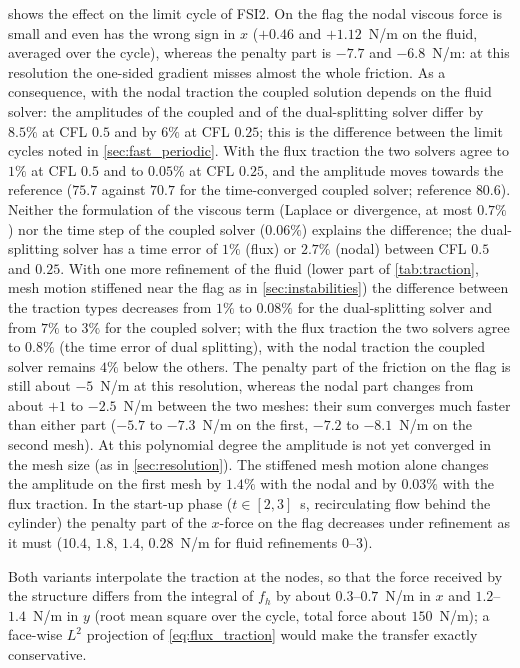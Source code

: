\documentclass[11pt,a4paper]{article}
\theoremstyle{definition}
\theoremstyle{remark}
\begin{document}
 shows the effect on the limit cycle of FSI2. On the flag the nodal viscous force
is small and even has the wrong sign in $x$ ($+0.46$ and $+1.12$~N/m on the fluid, averaged over
the cycle), whereas the penalty part is $-7.7$ and $-6.8$~N/m: at this resolution the one-sided
gradient misses almost the whole friction. As a consequence, with the nodal traction the coupled
solution depends on the fluid solver: the amplitudes of the coupled and of the dual-splitting
solver differ by $8.5\%$ at CFL $0.5$ and by $6\%$ at CFL $0.25$; this is the difference between
the limit cycles noted in \cref{sec:fast_periodic}. With the flux traction the two solvers agree to
$1\%$ at CFL $0.5$ and to $0.05\%$ at CFL $0.25$, and the amplitude moves towards the reference
($75.7$ against $70.7$ for the time-converged coupled solver; reference $80.6$). Neither the
formulation of the viscous term (Laplace or divergence, at most $0.7\%$) nor the time step of the
coupled solver ($0.06\%$) explains the difference; the dual-splitting solver has a time error of
$1\%$ (flux) or $2.7\%$ (nodal) between CFL $0.5$ and $0.25$. With one more refinement of the fluid (lower part of
\cref{tab:traction}, mesh motion stiffened near the flag as in \cref{sec:instabilities}) the
difference between the traction types decreases from $1\%$ to $0.08\%$ for the dual-splitting
solver and from $7\%$ to $3\%$ for the coupled solver; with the flux traction the two solvers agree
to $0.8\%$ (the time error of dual splitting), with the nodal traction the coupled solver remains
$4\%$ below the others. The penalty part of the friction on the flag is still about $-5$~N/m at
this resolution, whereas the nodal part changes from about $+1$ to $-2.5$~N/m between the two
meshes: their sum converges much faster than either part ($-5.7$ to $-7.3$~N/m on the first,
$-7.2$ to $-8.1$~N/m on the second mesh). At this polynomial degree the amplitude is not yet
converged in the mesh size (as in \cref{sec:resolution}). The stiffened mesh motion alone changes
the amplitude on the first mesh by $1.4\%$ with the nodal and by $0.03\%$ with the flux traction.
In the start-up phase ($t\in[2,3]$~s, recirculating flow behind the cylinder) the penalty part of the
$x$-force on the flag decreases under refinement as it must ($10.4$, $1.8$, $1.4$, $0.28$~N/m for
fluid refinements $0$--$3$).

Both variants interpolate the traction at the nodes, so that the force received by the structure
differs from the integral of $f_h$ by about $0.3$--$0.7$~N/m in $x$ and $1.2$--$1.4$~N/m in $y$
(root mean square over the cycle, total force about $150$~N/m); a face-wise $L^2$ projection of
\eqref{eq:flux_traction} would make the transfer exactly conservative.
\end{document}
